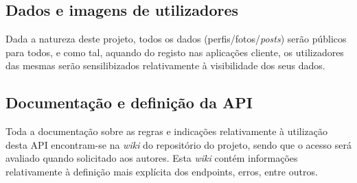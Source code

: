 \subsection{Dados e imagens de utilizadores}
Dada a natureza deste projeto, todos os dados (perfis/fotos/\textit{posts}) serão públicos para todos, e como tal, aquando do registo nas aplicações cliente, os utilizadores das mesmas serão sensilibizados relativamente à visibilidade dos seus dados.

\subsection{Documentação e definição da API}
Toda a documentação sobre as regras e indicações relativamente à utilização desta API encontram-se na \textit{wiki} do repositório do projeto, sendo que o acesso será avaliado quando solicitado aos autores. Esta \textit{wiki} contém informações relativamente à definição mais explícita dos endpoints, erros, entre outros.